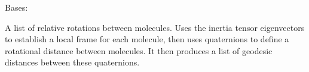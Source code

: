 \documentclass[letterpaper,10pt,english]{sphinxmanual}
\begin{document}
\begin{fulllineitems}
\label{doctree/soprano.properties.linkage.linkage:soprano.properties.linkage.linkage.MoleculeRelativeRotation}
Bases: {\hyperref[doctree/soprano.properties.atomsproperty:soprano.properties.atomsproperty.AtomsProperty]{}}

A list of relative rotations between molecules. Uses the inertia tensor
eigenvectors to establish a local frame for each molecule, then uses
quaternions to define a rotational distance between molecules. It then
produces a list of geodesic distances between these quaternions.


\end{fulllineitems}
\end{document}
